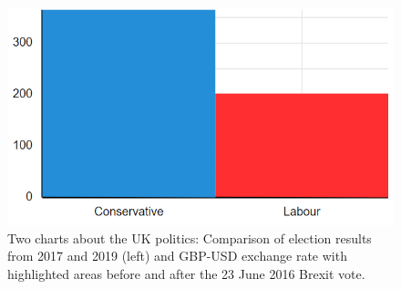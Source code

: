 \documentclass{jfp}
\begin{document}
\begin{figure}
  \includegraphics[scale=0.57]{figures/simple}
  \vspace{0.25em}
  \caption{Two charts about the UK politics: Comparison of election results from 2017 and 2019 (left)
    and GBP-USD exchange rate with highlighted areas before and after the 23 June 2016 Brexit vote.}
  \label{fig:simple}
\end{figure}
\end{document}

